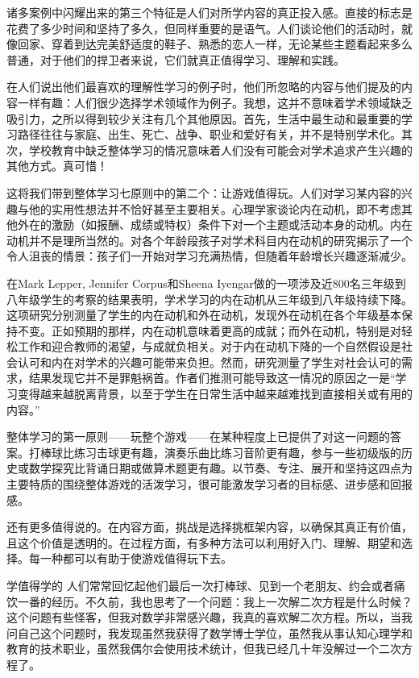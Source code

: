 诸多案例中闪耀出来的第三个特征是人们对所学内容的真正投入感。直接的标志是花费了多少时间和坚持了多久，但同样重要的是语气。人们谈论他们的活动时，就像回家、穿着到达完美舒适度的鞋子、熟悉的恋人一样，无论某些主题看起来多么普通，对于他们的捍卫者来说，它们就真正值得学习、理解和实践。

在人们说出他们最喜欢的理解性学习的例子时，他们所忽略的内容与他们提及的内容一样有趣：人们很少选择学术领域作为例子。我想，这并不意味着学术领域缺乏吸引力，之所以得到较少关注有几个其他原因。首先，生活中最生动和最重要的学习路径往往与家庭、出生、死亡、战争、职业和爱好有关，并不是特别学术化。其次，学校教育中缺乏整体学习的情况意味着人们没有可能会对学术追求产生兴趣的其他方式。真可惜！

这将我们带到整体学习七原则中的第二个：让游戏值得玩。人们对学习某内容的兴趣与他的实用性想法并不恰好甚至主要相关。心理学家谈论内在动机，即不考虑其他外在的激励（如报酬、成绩或特权）条件下对一个主题或活动本身的动机。内在动机并不是理所当然的。对各个年龄段孩子对学术科目内在动机的研究揭示了一个令人沮丧的情景：孩子们一开始对学习充满热情，但随着年龄增长兴趣逐渐减少。

在Mark Lepper, Jennifer Corpus和Sheena Iyengar做的一项涉及近800名三年级到八年级学生的考察的结果表明，学术学习的内在动机从三年级到八年级持续下降。这项研究分别测量了学生的内在动机和外在动机，发现外在动机在各个年级基本保持不变。正如预期的那样，内在动机意味着更高的成就；而外在动机，特别是对轻松工作和迎合教师的渴望，与成就负相关。对于内在动机下降的一个自然假设是社会认可和内在对学术的兴趣可能带来负担。然而，研究测量了学生对社会认可的需求，结果发现它并不是罪魁祸首。作者们推测可能导致这一情况的原因之一是“学习变得越来越脱离背景，以至于学生在日常生活中越来越难找到直接相关或有用的内容。”

整体学习的第一原则——玩整个游戏——在某种程度上已提供了对这一问题的答案。打棒球比练习击球更有趣，演奏乐曲比练习音阶更有趣，参与一些初级版的历史或数学探究比背诵日期或做算术题更有趣。以节奏、专注、展开和坚持这四点为主要特质的围绕整体游戏的活泼学习，很可能激发学习者的目标感、进步感和回报感。

还有更多值得说的。在内容方面，挑战是选择挑框架内容，以确保其真正有价值，且这个价值是透明的。在过程方面，有多种方法可以利用好入门、理解、期望和选择。每一种都可以有助于使游戏值得玩下去。

学值得学的
人们常常回忆起他们最后一次打棒球、见到一个老朋友、约会或者痛饮一番的经历。不久前，我也思考了一个问题：我上一次解二次方程是什么时候？
这个问题有些怪客，但我对数学非常感兴趣，我真的喜欢解二次方程。所以，当我问自己这个问题时，我发现虽然我获得了数学博士学位，虽然我从事认知心理学和教育的技术职业，虽然我偶尔会使用技术统计，但我已经几十年没解过一个二次方程了。

